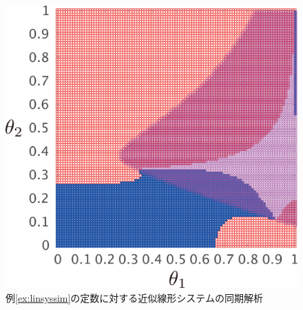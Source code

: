 \documentclass[a4j,10pt,oneside,openany,dvipdfmx]{jsbook}
\begin{document}
\begin{figure}[t]
{\begin{minipage}{0.32\linewidth}
    \centering
    \includegraphics[width = .85\linewidth]{figs/gam5thm}
  \end{minipage}
  \caption{例\ref{ex:linsyssim}の定数に対する近似線形システムの同期解析}
  \label{fig:gamthm}
  }
\end{figure}
\end{document}
